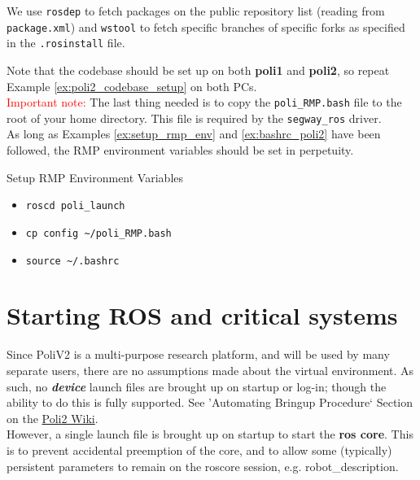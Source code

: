 We use \texttt{rosdep} to fetch packages on the public repository list (reading from \texttt{package.xml}) and \texttt{wstool} to fetch specific branches of specific forks as specified in the \texttt{.rosinstall} file.

Note that the codebase should be set up on both \textbf{poli1} and \textbf{poli2}, so repeat Example \ref{ex:poli2_codebase_setup} on both PCs. \\

\textcolor{red}{Important note:} The last thing needed is to copy the \texttt{poli\_RMP.bash} file to the root of your home directory. 
This file is required by the \texttt{segway\_ros} driver. \\
As long as Examples \ref{ex:setup_rmp_env} and \ref{ex:bashrc_poli2} have been followed, the RMP environment variables should be set in perpetuity. 

\begin{example}{Setup RMP Environment Variables}\label{ex:setup_rmp_env}
\begin{itemize}
  \item \texttt{roscd poli\_launch}
  \item \texttt{cp config \textasciitilde/poli\_RMP.bash }
  \item \texttt{source \textasciitilde/.bashrc}
\end{itemize}
\end{example}



\section{Starting ROS and critical systems}
Since PoliV2 is a multi-purpose research platform, and will be used by many separate users, there are no assumptions made about the virtual environment.
As such, no \textit{\textbf{device}} launch files are brought up on startup or log-in; though the ability to do this is fully supported. See 'Automating Bringup Procedure` Section on the \href{https://github.com/si-machines/poli2/wiki/How-To}{Poli2 Wiki}.\\


However, a single launch file is brought up on startup to start the \textbf{ros core}. This is to prevent accidental preemption of the core, and to allow some (typically) persistent parameters to remain on the roscore session, e.g. robot\_description. \\



